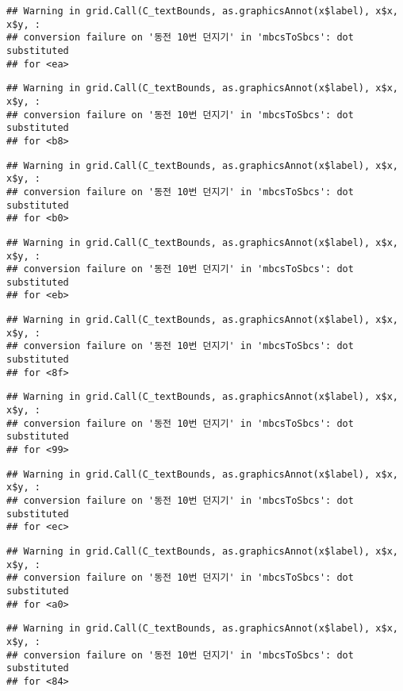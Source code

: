 \documentclass[]{book}
\begin{document}
\begin{verbatim}
## Warning in grid.Call(C_textBounds, as.graphicsAnnot(x$label), x$x, x$y, :
## conversion failure on '동전 10번 던지기' in 'mbcsToSbcs': dot substituted
## for <ea>
\end{verbatim}

\begin{verbatim}
## Warning in grid.Call(C_textBounds, as.graphicsAnnot(x$label), x$x, x$y, :
## conversion failure on '동전 10번 던지기' in 'mbcsToSbcs': dot substituted
## for <b8>
\end{verbatim}

\begin{verbatim}
## Warning in grid.Call(C_textBounds, as.graphicsAnnot(x$label), x$x, x$y, :
## conversion failure on '동전 10번 던지기' in 'mbcsToSbcs': dot substituted
## for <b0>
\end{verbatim}

\begin{verbatim}
## Warning in grid.Call(C_textBounds, as.graphicsAnnot(x$label), x$x, x$y, :
## conversion failure on '동전 10번 던지기' in 'mbcsToSbcs': dot substituted
## for <eb>
\end{verbatim}

\begin{verbatim}
## Warning in grid.Call(C_textBounds, as.graphicsAnnot(x$label), x$x, x$y, :
## conversion failure on '동전 10번 던지기' in 'mbcsToSbcs': dot substituted
## for <8f>
\end{verbatim}

\begin{verbatim}
## Warning in grid.Call(C_textBounds, as.graphicsAnnot(x$label), x$x, x$y, :
## conversion failure on '동전 10번 던지기' in 'mbcsToSbcs': dot substituted
## for <99>
\end{verbatim}

\begin{verbatim}
## Warning in grid.Call(C_textBounds, as.graphicsAnnot(x$label), x$x, x$y, :
## conversion failure on '동전 10번 던지기' in 'mbcsToSbcs': dot substituted
## for <ec>
\end{verbatim}

\begin{verbatim}
## Warning in grid.Call(C_textBounds, as.graphicsAnnot(x$label), x$x, x$y, :
## conversion failure on '동전 10번 던지기' in 'mbcsToSbcs': dot substituted
## for <a0>
\end{verbatim}

\begin{verbatim}
## Warning in grid.Call(C_textBounds, as.graphicsAnnot(x$label), x$x, x$y, :
## conversion failure on '동전 10번 던지기' in 'mbcsToSbcs': dot substituted
## for <84>
\end{verbatim}
\end{document}
